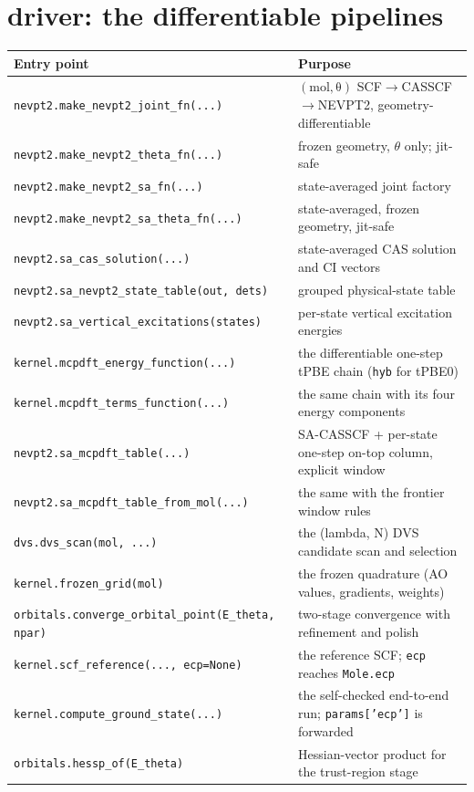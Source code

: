 \section{driver: the differentiable pipelines}

\begin{center}
\begin{tabularx}{\textwidth}{lX}
\toprule
Entry point & Purpose \\
\midrule
\texttt{nevpt2.make\_nevpt2\_joint\_fn(...)} & $\mathrm{(mol,\theta)}$ SCF$\to$CASSCF$\to$NEVPT2, geometry-differentiable \\
\texttt{nevpt2.make\_nevpt2\_theta\_fn(...)} & frozen geometry, $\theta$ only; jit-safe \\
\texttt{nevpt2.make\_nevpt2\_sa\_fn(...)} & state-averaged joint factory \\
\texttt{nevpt2.make\_nevpt2\_sa\_theta\_fn(...)} & state-averaged, frozen geometry, jit-safe \\
\texttt{nevpt2.sa\_cas\_solution(...)} & state-averaged CAS solution and CI vectors \\
\texttt{nevpt2.sa\_nevpt2\_state\_table(out, dets)} & grouped physical-state table \\
\texttt{nevpt2.sa\_vertical\_excitations(states)} & per-state vertical excitation energies \\
\texttt{kernel.mcpdft\_energy\_function(...)} & the differentiable one-step tPBE chain (\texttt{hyb} for tPBE0)\\
\texttt{kernel.mcpdft\_terms\_function(...)} & the same chain with its four energy components \\
\texttt{nevpt2.sa\_mcpdft\_table(...)} & SA-CASSCF + per-state one-step on-top column, explicit window \\
\texttt{nevpt2.sa\_mcpdft\_table\_from\_mol(...)} & the same with the frontier window rules \\
\texttt{dvs.dvs\_scan(mol, ...)} & the (lambda, N) DVS candidate scan and selection \\
\texttt{kernel.frozen\_grid(mol)} & the frozen quadrature (AO values, gradients, weights) \\
\texttt{orbitals.converge\_orbital\_point(E\_theta, npar)} & two-stage convergence with refinement and polish \\
\texttt{kernel.scf\_reference(..., ecp=None)} & the reference SCF; \texttt{ecp} reaches \texttt{Mole.ecp} \\
\texttt{kernel.compute\_ground\_state(...)} & the self-checked end-to-end run; \texttt{params['ecp']} is forwarded \\
\texttt{orbitals.hessp\_of(E\_theta)} & Hessian-vector product for the trust-region stage \\
\bottomrule
\end{tabularx}
\end{center}

